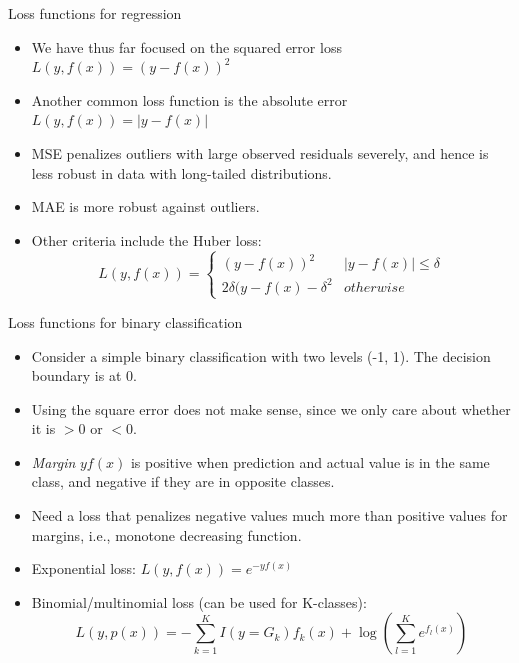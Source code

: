 \documentclass[aspectratio=169]{beamer}
\begin{document}
\begin{frame}{Loss functions for regression}
    \begin{itemize}
        \item We have thus far focused on the squared error loss $L(y, f(x)) = (y - f(x))^2$
        \item Another common loss function is the absolute error $L(y, f(x)) = |y - f(x)|$
        \item MSE penalizes outliers with large observed residuals severely, and hence is less robust in data with long-tailed distributions.
        \item MAE is more robust against outliers.
        \item Other criteria include the Huber loss:
        \begin{equation*}
            L(y, f(x)) = \left\{ \begin{array}{cc}
                (y - f(x))^2 & |y-f(x)| \leq \delta \\
                2\delta (y-f(x) - \delta^2 & otherwise
            \end{array}\right.
        \end{equation*}
    \end{itemize}
\end{frame}


\begin{frame}{Loss functions for binary classification}
    \begin{itemize}
        \item Consider a simple binary classification with two levels (-1, 1). The decision boundary is at 0.
        \item Using the square error does not make sense, since we only care about whether it is $>0$ or $<0$.
        \item \textit{Margin} $yf(x)$ is positive when prediction and actual value is in the same class, and negative if they are in opposite classes.
        \item Need a loss that penalizes negative values much more than positive values for margins, i.e., monotone decreasing function.
        \item Exponential loss: $L(y, f(x)) = e^{-yf(x)}$
        \item Binomial/multinomial loss (can be used for K-classes):
        \begin{equation*}
            L(y, p(x)) = -\sum_{k=1}^K I(y=G_k)f_k(x) + \log \left(\sum_{l=1}^K e^{f_l(x)}\right)
        \end{equation*}
    \end{itemize}
\end{frame}
\end{document}
